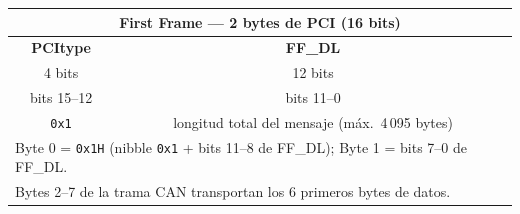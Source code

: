 \centering
\renewcommand{\arraystretch}{1.4}
\begin{tabular}{|c|c|}
\hline
\multicolumn{2}{|c|}{\textbf{First Frame — 2 bytes de PCI (16 bits)}} \\
\hline
\textbf{PCItype} & \textbf{FF\_DL} \\
\hline
4 bits & 12 bits \\
\hline
bits 15--12 & bits 11--0 \\
\hline
\texttt{0x1} & longitud total del mensaje (máx.\ 4\,095 bytes) \\
\hline
\multicolumn{2}{|l|}{\footnotesize Byte 0 = \texttt{0x1H} (nibble \texttt{0x1} + bits 11--8 de FF\_DL); Byte 1 = bits 7--0 de FF\_DL.} \\
\multicolumn{2}{|l|}{\footnotesize Bytes 2--7 de la trama CAN transportan los 6 primeros bytes de datos.} \\
\hline
\end{tabular}
